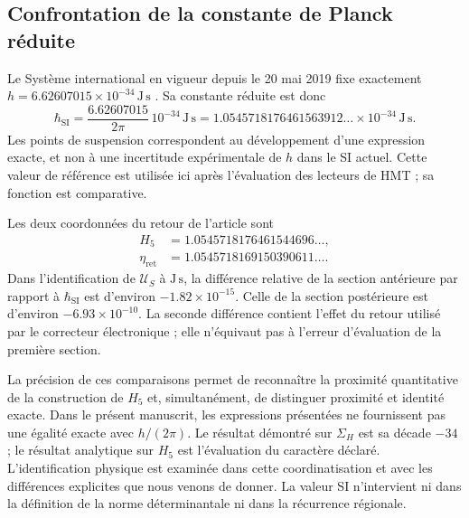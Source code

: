 \subsection{Confrontation de la constante de Planck réduite}
\label{sec:revision-planck-contraste}

Le Système international en vigueur depuis le 20 mai 2019 fixe
exactement \(h=6.62607015\times10^{-34}\,\mathrm{J\,s}\)
\cite{bipm2018}. Sa constante réduite est donc
\[
 \hbar_{\mathrm{SI}}=\frac{6.62607015}{2\pi}\,10^{-34}\,
 \mathrm{J\,s}
 =1.0545718176461563912\ldots\times10^{-34}\,\mathrm{J\,s}.
\]
Les points de suspension correspondent au développement d'une expression
exacte, et non à une incertitude expérimentale de \(h\) dans le SI actuel.
Cette valeur de référence est utilisée ici après l'évaluation des
lecteurs de HMT ; sa fonction est comparative.

Les deux coordonnées du retour de l'article sont
\begin{align*}
 H_5&=1.0545718176461544696\ldots,\\
 \eta_{\mathrm{ret}}&=1.0545718169150390611\ldots.
\end{align*}
Dans l'identification de \(\mathcal U_S\) à \(\mathrm{J\,s}\), la
différence relative de la section antérieure par rapport à
\(\hbar_{\mathrm{SI}}\) est d'environ \(-1.82\times10^{-15}\).
Celle de la section postérieure est d'environ \(-6.93\times10^{-10}\).
La seconde différence contient l'effet du retour utilisé par le
correcteur électronique ; elle n'équivaut pas à l'erreur d'évaluation de la
première section.

La précision de ces comparaisons permet de reconnaître la proximité
quantitative de la construction de \(H_5\) et, simultanément, de distinguer
proximité et identité exacte. Dans le présent manuscrit, les expressions
présentées ne fournissent pas une égalité exacte avec \(h/(2\pi)\).
Le résultat démontré sur \(\Sigma_H\) est sa décade \(-34\) ;
le résultat analytique sur \(H_5\) est l'évaluation du caractère
déclaré. L'identification physique est examinée dans cette coordinatisation et avec les
différences explicites que nous venons de donner. La valeur SI n'intervient
ni dans la définition de la norme déterminantale ni dans la récurrence régionale.
